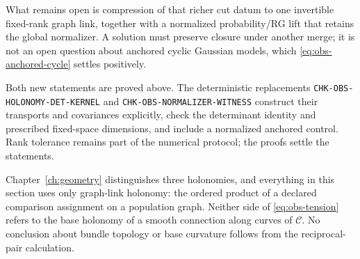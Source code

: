 What remains open is
compression of that richer cut datum to one invertible fixed-rank graph link,
together with a normalized probability/RG lift that retains the global
normalizer. A solution must preserve closure under another merge; it is not
an open question about anchored cyclic Gaussian models, which
\eqref{eq:obs-anchored-cycle} settles positively. 

Both new statements are proved above. The deterministic replacements \texttt{CHK-OBS-HOLONOMY-\allowbreak DET-KERNEL} and \texttt{CHK-OBS-NORMALIZER-WITNESS} construct their transports and covariances explicitly, check the determinant identity and prescribed fixed-space dimensions, and include a normalized anchored control. Rank tolerance remains part of the numerical protocol; the proofs settle the statements. 

Chapter~\ref{ch:geometry} distinguishes three holonomies, and everything in this section uses only graph-link holonomy: the ordered product of a declared comparison assignment on a population graph. Neither side of \eqref{eq:obs-tension} refers to the base holonomy of a smooth connection along curves of \(\mathcal C\). No conclusion about bundle topology or base curvature follows from the reciprocal-pair calculation. 
